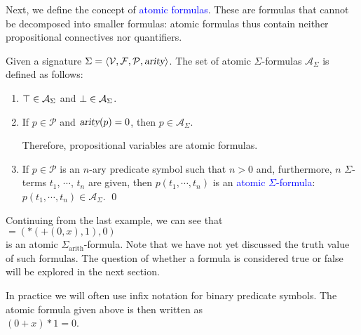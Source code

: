 Next, we define the concept of \textcolor{blue}{atomic formulas}. These are formulas
that cannot be decomposed into smaller formulas: atomic formulas thus contain neither propositional connectives
nor quantifiers. 
\begin{Definition}
  Given a signature $\Sigma = \langle \mathcal{V}, \mathcal{F}, \mathcal{P}, \textsl{arity} \rangle$. 
  The set of atomic $\Sigma$-formulas $\mathcal{A}_\Sigma$ 
  is defined as follows:
  \begin{enumerate}
  \item $\top \in \mathcal{A}_\Sigma$ and  $\bot \in \mathcal{A}_\Sigma$.
  \item If $p \in \mathcal{P}$ and $\textsl{arity}(p)= 0$, then $p \in \mathcal{A}_\Sigma$.

        Therefore, propositional variables are atomic formulas.
  \item If $p \in \mathcal{P}$ is an $n$-ary predicate symbol such that $n > 0$ and, furthermore,  $n$ $\Sigma$-terms
        $t_1$, $\cdots$, $t_n$ are given, then  $p(t_1,\cdots,t_n)$ is an \textcolor{blue}{atomic $\Sigma$-formula}: \\[0.2cm]
        \hspace*{1.3cm} $p(t_1,\cdots,t_n) \in \mathcal{A}_\Sigma$.  \qed
  \end{enumerate}
\end{Definition}

\exampleEng
Continuing from the last example, we can see that \\[0.2cm]
\hspace*{1.3cm} $\mathtt{=}(*(\mathtt{+}(0,x),1),0)$ \\[0.2cm]
is an atomic $\Sigma_\mathrm{arith}$-formula. Note that we have not yet discussed the truth value of such
formulas. The question of whether a formula is considered true or false
will be explored in the next section.

In practice we will often use infix notation for binary predicate symbols.  The atomic formula given above is then
written as
\\[0.2cm]
\hspace*{1.3cm}
$(0 + x) * 1 = 0$.
\eox


